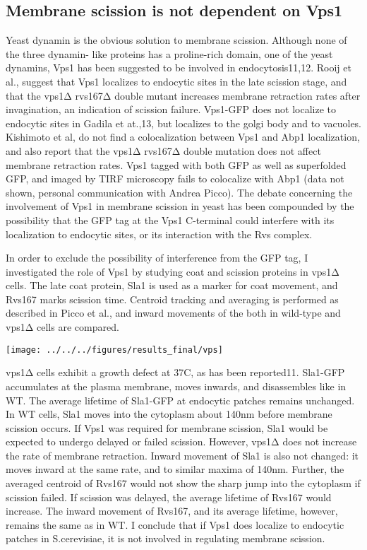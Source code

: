 	\subsection{Membrane scission is not dependent on Vps1}
	Yeast dynamin is the obvious solution to membrane scission. Although none of the three dynamin- like proteins has a proline-rich domain, one of the yeast dynamins, Vps1 has been suggested to be involved in endocytosis11,12. Rooij et al., suggest that Vps1 localizes to endocytic sites in the late scission stage, and that the vps1Δ rvs167Δ double mutant increases membrane retraction rates after invagination, an indication of scission failure. Vps1-GFP does not localize to endocytic sites in Gadila et at.,13, but localizes to the golgi body and to vacuoles. Kishimoto et al, do not find a colocalization between Vps1 and Abp1 localization, and also report that the vps1Δ rvs167Δ  double mutation does not affect membrane retraction rates. Vps1 tagged with both GFP as well as superfolded GFP, and imaged by TIRF microscopy fails to colocalize with Abp1 (data not shown, personal communication with Andrea Picco). The debate concerning the involvement of Vps1 in membrane scission in yeast has been compounded by the possibility that the GFP tag at the Vps1 C-terminal could interfere with its localization to endocytic sites, or its interaction with the Rvs complex. 
	
	\vspace{5mm}
	In order to exclude the possibility of interference from the GFP tag, I investigated the role of Vps1 by studying coat and scission proteins in vps1Δ cells. The late coat protein, Sla1 is used as a marker for coat movement, and Rvs167 marks scission time. Centroid tracking and averaging is performed as described in Picco et al., and inward movements of the both in wild-type and vps1Δ cells are compared. 

	\texttt{[image: ../../../figures/results\_final/vps]}
	

	
	\vspace{5mm}
	vps1Δ cells exhibit a growth defect at 37C, as has been reported11. Sla1-GFP accumulates at the plasma membrane, moves inwards, and disassembles like in WT. The average lifetime of Sla1-GFP at endocytic patches remains unchanged. In WT cells, Sla1 moves into the cytoplasm about 140nm before membrane scission occurs. If Vps1 was required for membrane scission, Sla1 would be expected to undergo delayed or failed scission. However, vps1Δ does not increase the rate of membrane retraction. Inward movement of Sla1 is also not changed: it moves inward at the same rate, and to similar maxima of 140nm. Further, the averaged centroid of Rvs167 would not show the sharp jump into the cytoplasm if scission failed. If scission was delayed, the average lifetime of Rvs167 would increase. The inward movement of Rvs167, and its average lifetime, however, remains the same as in WT. I conclude that if Vps1 does localize to endocytic patches in S.cerevisiae, it is not involved in regulating membrane scission.  


